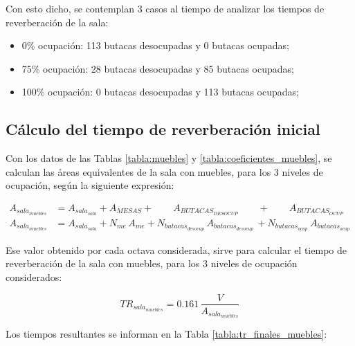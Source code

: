 	Con esto dicho, se contemplan 3 casos al tiempo de analizar los tiempos de reverberación de la sala:
	
	\begin{itemize}
		\item 0\% ocupación: 113 butacas desocupadas y 0 butacas ocupadas;
		\item 75\% ocupación: 28 butacas desocupadas y 85 butacas ocupadas;
		\item 100\% ocupación: 0 butacas desocupadas y 113 butacas ocupadas;
	\end{itemize}

\subsection{Cálculo del tiempo de reverberación inicial}

	Con los datos de las Tablas \ref{tabla:muebles} y \ref{tabla:coeficientes_muebles}, se calculan las åreas equivalentes de la sala con muebles, para los 3 niveles de ocupación, según la siguiente expresión:
	
		\begin{align*}
			A_{sala_{muebles}} &= A_{sala_{sola}} + A_{MESAS} +  \qquad A_{BUTACAS_{DESOCUP}} \qquad + \qquad A_{BUTACAS_{OCUP}}\\
			A_{sala_{muebles}} &= A_{sala_{sola}} + N_{me}\,A_{me} + N_{butacas_{desocup}}\,A_{butacas_{desocup}} \,+ N_{butacas_{ocup}}\,A_{butacas_{ocup}}
		\end{align*}
	
		Ese valor obtenido por cada octava considerada, sirve para calcular el tiempo de reverberación de la sala con muebles, para los 3 niveles de ocupación considerados:
		
		\begin{equation}
			TR_{sala_{muebles}} = 0.161 \, \frac{V}{A_{sala_{muebles}}}
		\end{equation}
		
		Los tiempos resultantes se informan en la Tabla \ref{tabla:tr_finales_muebles}:

